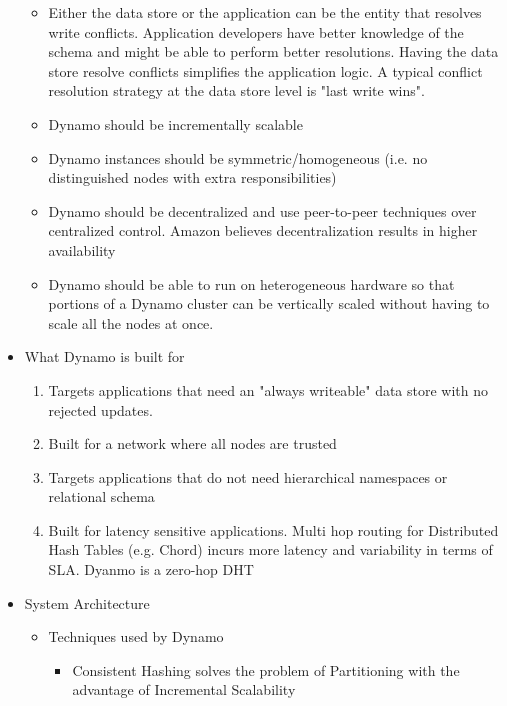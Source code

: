 \documentclass[a4paper]{article}
\begin{document}
\begin{itemize}
\begin{itemize}
\item Either the data store or the application can be the entity that resolves write conflicts. Application developers have better knowledge of the schema and might be able to perform better resolutions. Having the data store resolve conflicts simplifies the application logic. A typical conflict resolution strategy at the data store level is "last write wins".

\item Dynamo should be incrementally scalable

\item Dynamo instances should be symmetric/homogeneous (i.e. no distinguished nodes with extra responsibilities)

\item Dynamo should be decentralized and use peer-to-peer techniques over centralized control. Amazon believes decentralization results in higher availability

\item Dynamo should be able to run on heterogeneous hardware so that portions of a Dynamo cluster can be vertically scaled without having to scale all the nodes at once.
\end{itemize}

\item What Dynamo is built for
\begin{enumerate}
\item Targets applications that need an "always writeable" data store with no rejected updates.

\item Built for a network where all nodes are trusted

\item Targets applications that do not need hierarchical namespaces or relational schema

\item Built for latency sensitive applications. Multi hop routing for Distributed Hash Tables (e.g. Chord) incurs more latency and variability in terms of SLA. Dyanmo is a zero-hop DHT 
\end{enumerate}

\item System Architecture
\begin{itemize}
\item Techniques used by Dynamo
\begin{itemize}
\item Consistent Hashing solves the problem of Partitioning with the advantage of Incremental Scalability


\end{itemize}
\end{itemize}
\end{itemize}
\end{document}
